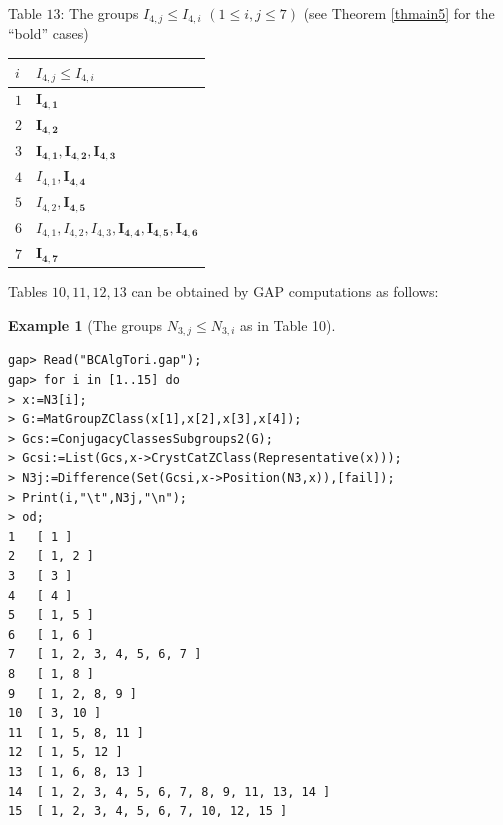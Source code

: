 \documentclass{amsart}
\theoremstyle{plain}
\theoremstyle{definition}
\newtheorem{example}[theorem]{Example}
\theoremstyle{remark}
\begin{document}
Table $13$: The groups $I_{4,j}\leq I_{4,i}$ $(1\leq i,j\leq 7)$ 
(see Theorem \ref{thmain5} for the ``bold'' cases)%
{\small 
\begin{longtable}{ll}
$i$ & $I_{4,j}\leq I_{4,i}$\\\hline
\endfirsthead
$1$ & $\bm{I_{4,1}}$\\
$2$ & $\bm{I_{4,2}}$\\
$3$ & $\bm{I_{4,1}}, \bm{I_{4,2}}, \bm{I_{4,3}}$\\
$4$ & $I_{4,1}, \bm{I_{4,4}}$\\
$5$ & $I_{4,2}, \bm{I_{4,5}}$\\
$6$ & $I_{4,1}, I_{4,2}, I_{4,3}, \bm{I_{4,4}}, \bm{I_{4,5}}, \bm{I_{4,6}}$\\
$7$ & $\bm{I_{4,7}}$
\end{longtable}
}
\vspace*{2mm}
Tables $10, 11, 12, 13$ can be obtained by GAP computations as follows: 

\bigskip
\begin{example}[The groups $N_{3,j}\leq N_{3,i}$ as in Table 10]~\vspace*{-5mm}\\
\begin{verbatim}
gap> Read("BCAlgTori.gap");
gap> for i in [1..15] do
> x:=N3[i];
> G:=MatGroupZClass(x[1],x[2],x[3],x[4]);
> Gcs:=ConjugacyClassesSubgroups2(G);
> Gcsi:=List(Gcs,x->CrystCatZClass(Representative(x)));
> N3j:=Difference(Set(Gcsi,x->Position(N3,x)),[fail]);
> Print(i,"\t",N3j,"\n");
> od;
1	[ 1 ]
2	[ 1, 2 ]
3	[ 3 ]
4	[ 4 ]
5	[ 1, 5 ]
6	[ 1, 6 ]
7	[ 1, 2, 3, 4, 5, 6, 7 ]
8	[ 1, 8 ]
9	[ 1, 2, 8, 9 ]
10	[ 3, 10 ]
11	[ 1, 5, 8, 11 ]
12	[ 1, 5, 12 ]
13	[ 1, 6, 8, 13 ]
14	[ 1, 2, 3, 4, 5, 6, 7, 8, 9, 11, 13, 14 ]
15	[ 1, 2, 3, 4, 5, 6, 7, 10, 12, 15 ]
\end{verbatim}
\end{example}
\end{document}
